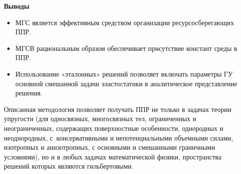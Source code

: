 \pagebreak



{\bf Выводы}



\begin{itemize}

\item[1.] МГС является эффективным средством организации ресурсосберегающих ППР.

\item[2.] МГСВ рациональным образом обеспечивает присутствие констант среды в ППР.

\item[3.] Использование «эталонных» решений позволяет включать параметры ГУ основной смешанной задачи эластостатики в аналитическое представление решения.



\end{itemize}



Описанная методология позволяет получать ППР не только в задачах теории упругости (для односвязных, многосвязных тел, ограниченных и неограниченных, содержащих поверхностные особенности, однородных и неоднородных, с~консервативными и непотенциальными объемными силами, изотропных и анизотропных, с основными и смешанными граничными условиями), но и в любых задачах математической физики, пространства решений которых являются гильбертовыми.
















